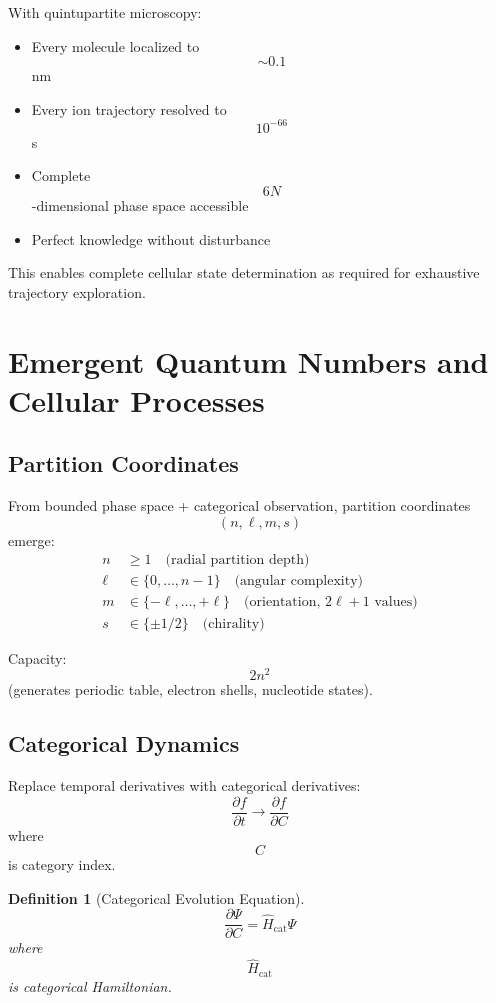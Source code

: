 \documentclass[11pt,twocolumn,a4paper]{article}
\newtheorem{definition}[theorem]{Definition}
\theoremstyle{remark}
\begin{document}
With quintupartite microscopy:
\begin{itemize}
\item Every molecule localized to $$\sim 0.1$$ nm
\item Every ion trajectory resolved to $$10^{-66}$$ s
\item Complete $$6N$$-dimensional phase space accessible
\item Perfect knowledge without disturbance
\end{itemize}

This enables complete cellular state determination as required for exhaustive trajectory exploration.

\section{Emergent Quantum Numbers and Cellular Processes}
\label{sec:quantum_numbers}

\subsection{Partition Coordinates}

From bounded phase space + categorical observation, partition coordinates $$(n,\ell,m,s)$$ emerge:
\begin{align}
n &\geq 1 \quad \text{(radial partition depth)} \\
\ell &\in \{0, \ldots, n-1\} \quad \text{(angular complexity)} \\
m &\in \{-\ell, \ldots, +\ell\} \quad \text{(orientation, } 2\ell+1 \text{ values)} \\
s &\in \{\pm 1/2\} \quad \text{(chirality)}
\end{align}

Capacity: $$2n^2$$ (generates periodic table, electron shells, nucleotide states).

\subsection{Categorical Dynamics}

Replace temporal derivatives with categorical derivatives:
$$
\frac{\partial f}{\partial t} \to \frac{\partial f}{\partial C}
$$
where $$C$$ is category index.

\begin{definition}[Categorical Evolution Equation]
\label{def:categorical_evolution}
$$
\frac{\partial \Psi}{\partial C} = \hat{H}_{\mathrm{cat}} \Psi
$$
where $$\hat{H}_{\mathrm{cat}}$$ is categorical Hamiltonian.
\end{definition}
\end{document}
